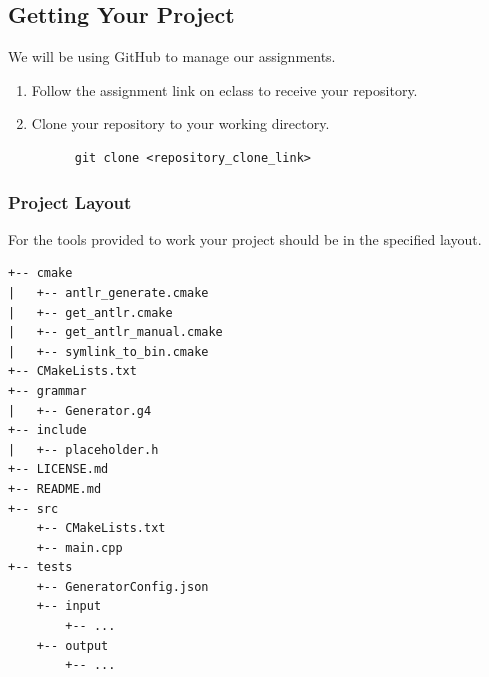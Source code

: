 \documentclass{article}
\begin{document}
\subsection{Getting Your Project}
We will be using GitHub to manage our assignments.
\begin{enumerate}
  \item
    Follow the assignment link on eclass to receive your repository.
  \item
    Clone your repository to your working directory.
    \begin{lstlisting}
      git clone <repository_clone_link>
    \end{lstlisting}
\end{enumerate}

\subsubsection{Project Layout}
For the tools provided to work your project should be in the specified layout.
\begin{lstlisting}
+-- cmake
|   +-- antlr_generate.cmake
|   +-- get_antlr.cmake
|   +-- get_antlr_manual.cmake
|   +-- symlink_to_bin.cmake
+-- CMakeLists.txt
+-- grammar
|   +-- Generator.g4
+-- include
|   +-- placeholder.h
+-- LICENSE.md
+-- README.md
+-- src
    +-- CMakeLists.txt
    +-- main.cpp
+-- tests
    +-- GeneratorConfig.json
    +-- input
        +-- ...
    +-- output
        +-- ...
\end{lstlisting}
\end{document}
